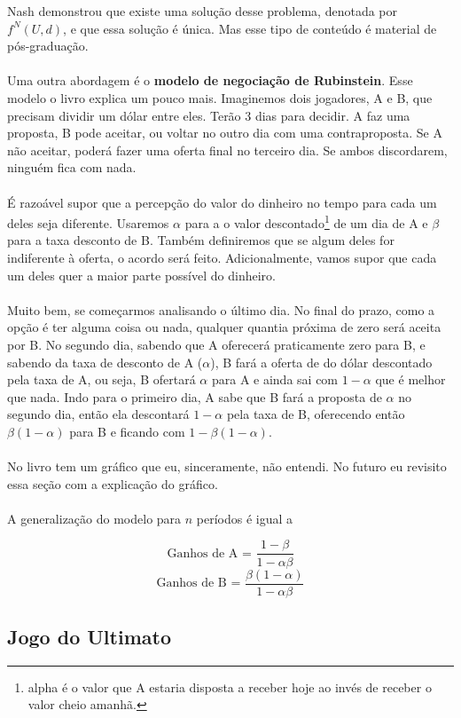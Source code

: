\documentclass[a4paper,11pt,oneside]{book}
\theoremstyle{definition}
\theoremstyle{break}
\begin{document}
Nash demonstrou que existe uma solução desse problema, denotada por $f^N(U,d)$, e que essa solução é única. Mas esse tipo de conteúdo é material de pós-graduação.
\\
\\
Uma outra abordagem é o \textbf{modelo de negociação de Rubinstein}. Esse modelo o livro explica um pouco mais. Imaginemos dois jogadores, A e B, que precisam dividir um dólar entre eles. Terão 3 dias para decidir. A faz uma proposta, B pode aceitar, ou voltar no outro dia com uma contraproposta. Se A não aceitar, poderá fazer uma oferta final no terceiro dia. Se ambos discordarem, ninguém fica com nada.
\\
\\
É razoável supor que a percepção do valor do dinheiro no tempo para cada um deles seja diferente. Usaremos $\alpha$ para a o valor descontado\footnote{alpha é o valor que A estaria disposta a receber hoje ao invés de receber o valor cheio amanhã.} de um dia de A e $\beta$ para a taxa desconto de B. Também definiremos que se algum deles for indiferente à oferta, o acordo será feito. Adicionalmente, vamos supor que cada um deles quer a maior parte possível do dinheiro.
\\
\\
Muito bem, se começarmos analisando o último dia. No final do prazo, como a opção é ter alguma coisa ou nada, qualquer quantia próxima de zero será aceita por B. No segundo dia, sabendo que A oferecerá praticamente zero para B, e sabendo da taxa de desconto de A ($\alpha$), B fará a oferta de do dólar descontado pela taxa de A, ou seja, B ofertará $\alpha$ para A e ainda sai com $1 - \alpha$ que é melhor que nada. Indo para o primeiro dia, A sabe que B fará a proposta de $\alpha$ no segundo dia, então ela descontará $1-\alpha$ pela taxa de B, oferecendo então $\beta(1-\alpha)$ para B e ficando com $1 - \beta(1-\alpha)$.
\\
\\
No livro tem um gráfico que eu, sinceramente, não entendi. No futuro eu revisito essa seção com a explicação do gráfico.
\\
\\
A generalização do modelo para $n$ períodos é igual a

$$\textrm{Ganhos de A = } \frac{1-\beta}{1-\alpha\beta}$$
$$\textrm{Ganhos de B = } \frac{\beta(1 - \alpha)}{1-\alpha\beta}$$

\subsection{Jogo do Ultimato}
\end{document}

